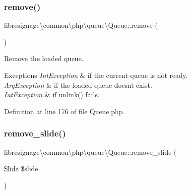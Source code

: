 \mbox{\label{classlibresignage_1_1common_1_1php_1_1queue_1_1Queue_a25cadc947d5912bf1b1b110308783896}} 
\subsubsection{\texorpdfstring{remove()}{remove()}}
{\footnotesize\ttfamily libresignage\textbackslash{}common\textbackslash{}php\textbackslash{}queue\textbackslash{}\+Queue\+::remove (\begin{DoxyParamCaption}{ }\end{DoxyParamCaption})}

Remove the loaded queue.


\begin{DoxyExceptions}{Exceptions}
{\em Int\+Exception} & if the current queue is not ready. \\
\hline
{\em Arg\+Exception} & if the loaded queue doesn\textquotesingle{}t exist. \\
\hline
{\em Int\+Exception} & if unlink() fails. \\
\hline
\end{DoxyExceptions}


Definition at line 176 of file Queue.\+php.

\mbox{\label{classlibresignage_1_1common_1_1php_1_1queue_1_1Queue_a2a8734f0c48a6ce5601b616758c5d2d1}} 
\subsubsection{\texorpdfstring{remove\+\_\+slide()}{remove\_slide()}}
{\footnotesize\ttfamily libresignage\textbackslash{}common\textbackslash{}php\textbackslash{}queue\textbackslash{}\+Queue\+::remove\+\_\+slide (\begin{DoxyParamCaption}\item[{\hyperlink{classlibresignage_1_1common_1_1php_1_1slide_1_1Slide}{Slide}}]{\$slide }\end{DoxyParamCaption})}

